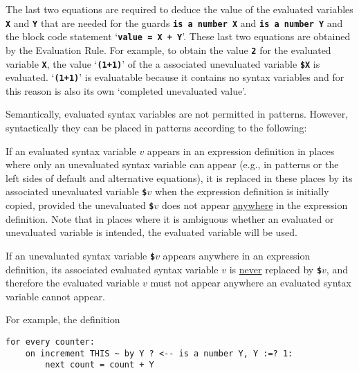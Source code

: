 \documentclass[12pt]{article}
\newcommand{\TT}[1]{{\tt \bfseries #1}}
\newcommand{\ikey}[2]{{\bf \em #1}\index{#2}}
\newenvironment{indpar}[1][0.3in]%
	{\begin{list}{}%
		     {\setlength{\itemsep}{0in}%
		      \setlength{\topsep}{0in}%
		      \setlength{\parsep}{1ex}%
		      \setlength{\labelwidth}{#1}%
		      \setlength{\leftmargin}{#1}%
		      \addtolength{\leftmargin}{\labelsep}}%
	 \item}%
	{\end{list}}
\begin{document}
The last two equations are required to deduce the value of the evaluated
variables \TT{X} and \TT{Y} that are needed for the guards
\TT{is a number X} and \TT{is a number Y} and the block code statement
`\TT{value = X + Y}'.  These last two equations are obtained by
the Evaluation Rule.  For example, to obtain the value \TT{2} for the
evaluated variable \TT{X}, the value `\TT{(1+1)}' of the a associated
unevaluated variable \TT{\$X} is evaluated.  `\TT{(1+1)}' is
evaluatable because it contains no syntax variables and for this reason is
also its own `completed unevaluated value'.

Semantically, evaluated syntax variables are not permitted in patterns.
However, syntactically they can be placed in patterns according to the
following:

\begin{indpar}
\begin{list}{}{}
\item [\ikey{Evaluated Variable Promotion Rule}%
{evaluated variable!promotion rule}:]%
\label{EVALUATED-VARIABLE-PROMOTION-RULE}
If an evaluated syntax variable $v$ appears in an expression definition
in places where only an unevaluated syntax variable can appear
(e.g., in patterns or the left sides of default and alternative
equations), it is
replaced in these places by its associated unevaluated variable
\TT{\$}$v$ when the expression definition is initially copied,
provided the unevaluated \TT{\$}$v$ does not appear \underline{anywhere}
in the expression definition.  Note that in places where it is ambiguous
whether an evaluated or unevaluated variable is intended, the evaluated
variable will be used.

If an unevaluated syntax variable \TT{\$}$v$ appears anywhere in
an expression definition, its associated evaluated syntax variable $v$
is \underline{never} replaced by \TT{\$}$v$, and therefore the evaluated
variable $v$ must not appear anywhere an evaluated syntax variable
cannot appear.
\end{list}
\end{indpar}

For example, the definition

\begin{indpar}\begin{verbatim}
for every counter:
    on increment THIS ~ by Y ? <-- is a number Y, Y :=? 1:
        next count = count + Y
\end{verbatim}\end{indpar}
\end{document}
